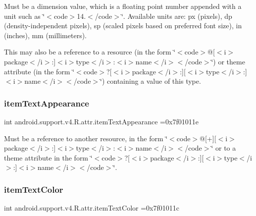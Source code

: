 Must be a dimension value, which is a floating point number appended with a unit such as \char`\"{}$<$code$>$14.\+5sp$<$/code$>$\char`\"{}. Available units are\+: px (pixels), dp (density-\/independent pixels), sp (scaled pixels based on preferred font size), in (inches), mm (millimeters). 

This may also be a reference to a resource (in the form \char`\"{}$<$code$>$@\mbox{[}$<$i$>$package$<$/i$>$\+:\mbox{]}$<$i$>$type$<$/i$>$\+:$<$i$>$name$<$/i$>$$<$/code$>$\char`\"{}) or theme attribute (in the form \char`\"{}$<$code$>$?\mbox{[}$<$i$>$package$<$/i$>$\+:\mbox{]}\mbox{[}$<$i$>$type$<$/i$>$\+:\mbox{]}$<$i$>$name$<$/i$>$$<$/code$>$\char`\"{}) containing a value of this type. \mbox{\label{classandroid_1_1support_1_1v4_1_1R_1_1attr_a1ba476808cf74de21a386d8c81888cf9}} 
\subsubsection{\texorpdfstring{item\+Text\+Appearance}{itemTextAppearance}}
{\footnotesize\ttfamily int android.\+support.\+v4.\+R.\+attr.\+item\+Text\+Appearance =0x7f01011e\hspace{0.3cm}{\ttfamily [static]}}

Must be a reference to another resource, in the form \char`\"{}$<$code$>$@\mbox{[}+\mbox{]}\mbox{[}$<$i$>$package$<$/i$>$\+:\mbox{]}$<$i$>$type$<$/i$>$\+:$<$i$>$name$<$/i$>$$<$/code$>$\char`\"{} or to a theme attribute in the form \char`\"{}$<$code$>$?\mbox{[}$<$i$>$package$<$/i$>$\+:\mbox{]}\mbox{[}$<$i$>$type$<$/i$>$\+:\mbox{]}$<$i$>$name$<$/i$>$$<$/code$>$\char`\"{}. \mbox{\label{classandroid_1_1support_1_1v4_1_1R_1_1attr_a4281f0a5c0d3ca403f692457be471fe7}} 
\subsubsection{\texorpdfstring{item\+Text\+Color}{itemTextColor}}
{\footnotesize\ttfamily int android.\+support.\+v4.\+R.\+attr.\+item\+Text\+Color =0x7f01011c\hspace{0.3cm}{\ttfamily [static]}}


